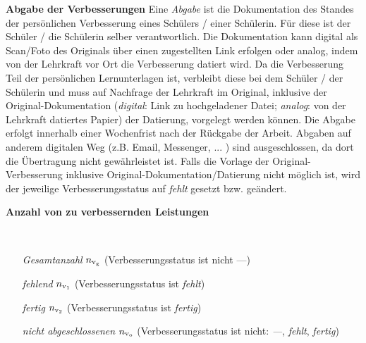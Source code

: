 \begin{enumerate}[label=\textbf{(\arabic*)}, align=left, leftmargin=*]
{	\item \textbf{Abgabe der Verbesserungen} { \thisfontsize Eine \glqq \textit{Abgabe}\grqq{} ist die Dokumentation des Standes der persönlichen Verbesserung eines Schülers / einer Schülerin. Für diese ist der Schüler / die Schülerin selber verantwortlich. Die Dokumentation kann digital als Scan/Foto des Originals über einen zugestellten Link erfolgen oder analog, indem von der Lehrkraft vor Ort die Verbesserung datiert wird. Da die Verbesserung Teil der persönlichen Lernunterlagen ist, verbleibt diese bei dem Schüler / der Schülerin und muss auf Nachfrage der Lehrkraft im Original, inklusive der Original-Dokumentation (\textit{digital}: Link zu hochgeladener Datei; \textit{analog}: von der Lehrkraft datiertes Papier) der Datierung, vorgelegt werden können. Die Abgabe erfolgt innerhalb einer Wochenfrist nach der Rückgabe der Arbeit. Abgaben auf anderem digitalen Weg (z.B. Email, Messenger, ... ) sind ausgeschlossen, da dort die Übertragung nicht gewährleistet ist. Falls die Vorlage der Original-Verbesserung inklusive Original-Dokumentation/Datierung nicht möglich ist, wird der jeweilige Verbesserungsstatus auf \glqq \textit{fehlt}\grqq{} gesetzt bzw. geändert.} 
	\item \textbf{Anzahl von zu verbessernden Leistungen} { \thisfontsize \mbox{} \
	\setlength{\columnsep}{-20pt}
	\begin{multicols}{2}
	\begin{enumerate}[label=\textbf{\textbullet}, align=left, leftmargin=*]
		\item[\textit{Gesamtanzahl}] $n_{\mathrm{v}_\mathrm{g}}$ (Verbesserungsstatus ist nicht \glqq ---\grqq{})
		\item[\textit{fehlend}] $n_{\mathrm{v}_1}$ (Verbesserungsstatus ist \glqq \textit{fehlt}\grqq{})
		\item[\textit{fertig}] $n_{\mathrm{v}_2}$ (Verbesserungsstatus ist \glqq \textit{fertig}\grqq{})
		\item[\textit{nicht abgeschlossenen}] $n_{\mathrm{v}_\mathrm{o}}$ (Verbesserungsstatus ist nicht: \glqq\textit{---}\grqq{}, \glqq\textit{fehlt}\grqq{}, \glqq\textit{fertig}\grqq{})
	\end{enumerate}
	\end{multicols}
	}
	\vspace*{-12pt}
	}
	

\end{enumerate}
